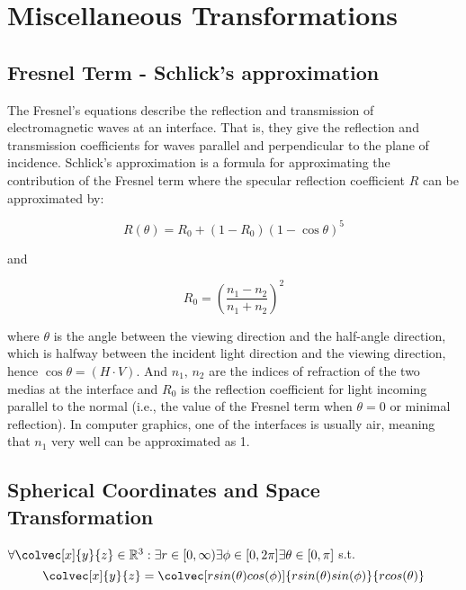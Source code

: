 \chapter{Miscellaneous Transformations}
\section{Fresnel Term - Schlick's approximation}
The Fresnel's equations describe the reflection and transmission of electromagnetic waves at an interface. That is, they give the reflection and transmission coefficients for waves parallel and perpendicular to the plane of incidence. Schlick's approximation is a formula for approximating the contribution of the Fresnel term where the specular reflection coefficient $R$ can be approximated by:

\begin{equation}
 R(\theta) = R_0 + (1 - R_0)(1 - \cos \theta)^5
\label{eq:schlickapprox}
\end{equation}

and

\begin{equation*}
  R_0 = \left(\frac{n_1-n_2}{n_1+n_2}\right)^2
\end{equation*}

where $\theta$ is the angle between the viewing direction and the half-angle direction, which is halfway between the incident 
light direction and the viewing direction, hence $\cos\theta=(H\cdot V)$. And $n_1,\,n_2$ are the indices of refraction of the two medias at the interface and $R_0$ is the reflection coefficient for light incoming parallel to the normal (i.e., the value of the Fresnel term when $\theta = 0$ or minimal reflection). In computer graphics, one of the interfaces is usually air, meaning that $n_1$ very well can be approximated as 1.

\section{Spherical Coordinates and Space Transformation}
\label{sec:sphericalcoordinates}


$\forall \colvec[x]{y}{z} \in \mathbb{R}^3 : \exists r \in [0,\infty) \exists \phi \in [0,2\pi] \exists \theta \in [0,\pi] $ s.t.
\begin{equation*}
\colvec[x]{y}{z} = \colvec[r sin(\theta)cos(\phi)]{r sin(\theta)sin(\phi)}{r cos(\theta)}
\label{eq:sphericalcoordinates}
\end{equation*}

